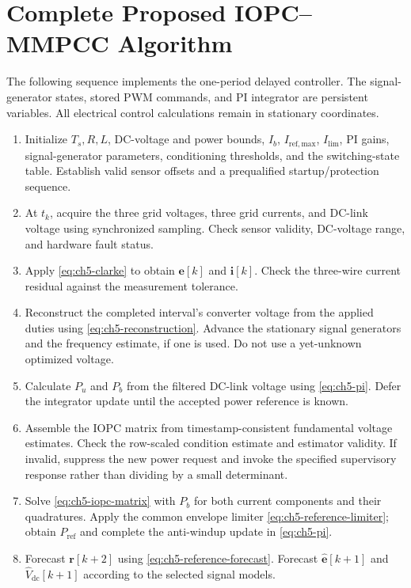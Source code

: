 \section{Complete Proposed IOPC--MMPCC Algorithm}
\label{sec:ch5-algorithm}
The following sequence implements the one-period delayed controller. The signal-generator states, stored PWM commands, and PI integrator are persistent variables. All electrical control calculations remain in stationary coordinates.
\begin{enumerate}
\item Initialize $T_s,R,L$, DC-voltage and power bounds, $I_b$, $I_{\mathrm{ref,max}}$, $I_{\mathrm{lim}}$, PI gains, signal-generator parameters, conditioning thresholds, and the switching-state table. Establish valid sensor offsets and a prequalified startup/protection sequence.
\item At $t_k$, acquire the three grid voltages, three grid currents, and DC-link voltage using synchronized sampling. Check sensor validity, DC-voltage range, and hardware fault status.
\item Apply \eqref{eq:ch5-clarke} to obtain $\mathbf e[k]$ and $\mathbf i[k]$. Check the three-wire current residual against the measurement tolerance.
\item Reconstruct the completed interval's converter voltage from the applied duties using \eqref{eq:ch5-reconstruction}. Advance the stationary signal generators and the frequency estimate, if one is used. Do not use a yet-unknown optimized voltage.
\item Calculate $P_u$ and $P_b$ from the filtered DC-link voltage using \eqref{eq:ch5-pi}. Defer the integrator update until the accepted power reference is known.
\item Assemble the IOPC matrix from timestamp-consistent fundamental voltage estimates. Check the row-scaled condition estimate and estimator validity. If invalid, suppress the new power request and invoke the specified supervisory response rather than dividing by a small determinant.
\item Solve \eqref{eq:ch5-iopc-matrix} with $P_b$ for both current components and their quadratures. Apply the common envelope limiter \eqref{eq:ch5-reference-limiter}; obtain $P_{\mathrm{ref}}$ and complete the anti-windup update in \eqref{eq:ch5-pi}.
\item Forecast $\mathbf r[k+2]$ using \eqref{eq:ch5-reference-forecast}. Forecast $\widehat{\mathbf e}[k+1]$ and $\widehat V_{\mathrm{dc}}[k+1]$ according to the selected signal models.

\end{enumerate}
